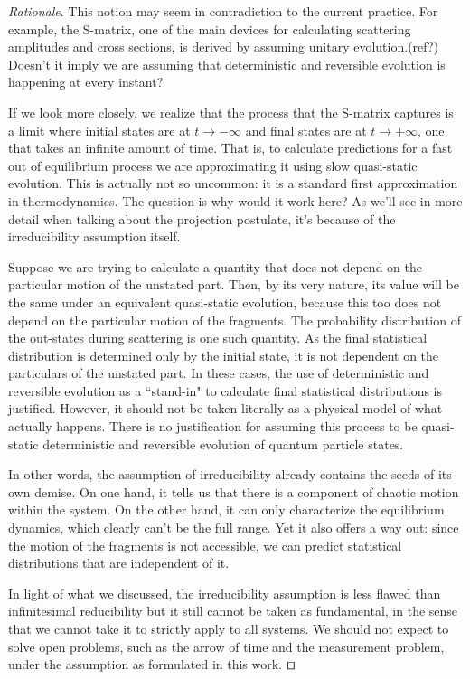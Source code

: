 \documentclass[smallextended]{svjour3}
\numberwithin{equation}{section}
\newenvironment{rationale}{\emph{Rationale}.}{\hfill\(\qed\)}
\begin{document}
\begin{rationale}
	This notion may seem in contradiction to the current practice. For example, the S-matrix, one of the main devices for calculating scattering amplitudes and cross sections, is derived by assuming unitary evolution.(ref?) Doesn't it imply we are assuming that deterministic and reversible evolution is happening at every instant?
	
	If we look more closely, we realize that the process that the S-matrix captures is a limit where initial states are at $t \rightarrow - \infty$ and final states are at $t \rightarrow + \infty$, one that takes an infinite amount of time.  That is, to calculate predictions for a fast out of equilibrium process we are approximating it using slow quasi-static evolution. This is actually not so uncommon: it is a standard first approximation in thermodynamics. The question is why would it work here? As we'll see in more detail when talking about the projection postulate, it's because of the irreducibility assumption itself.
	
	Suppose we are trying to calculate a quantity that does not depend on the particular motion of the unstated part. Then, by its very nature, its value will be the same under an equivalent quasi-static evolution, because this too does not depend on the particular motion of the fragments. The probability distribution of the out-states during scattering is one such quantity. As the final statistical distribution is determined only by the initial state, it is not dependent on the particulars of the unstated part. In these cases, the use of deterministic and reversible evolution as a ``stand-in" to calculate final statistical distributions is justified. However, it should not be taken literally as a physical model of what actually happens. There is no justification for assuming this process to be quasi-static deterministic and reversible evolution of quantum particle states.
	
	In other words, the assumption of irreducibility already contains the seeds of its own demise. On one hand, it tells us that there is a component of chaotic motion within the system. On the other hand, it can only characterize the equilibrium dynamics, which clearly can't be the full range. Yet it also offers a way out: since the motion of the fragments is not accessible, we can predict statistical distributions that are independent of it.
	
	In light of what we discussed, the irreducibility assumption is less flawed than infinitesimal reducibility but it still cannot be taken as fundamental, in the sense that we cannot take it to strictly apply to all systems. We should not expect to solve open problems, such as the arrow of time and the measurement problem, under the assumption as formulated in this work.
\end{rationale}
\end{document}
